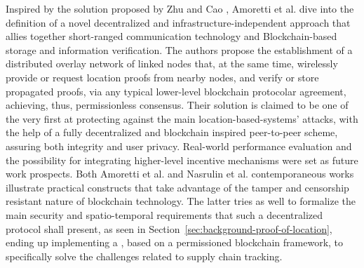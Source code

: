 Inspired by the solution proposed by Zhu and Cao \cite{zhu2011applaus}, Amoretti et al. \cite{amoretti2018blockchain} dive into the definition of a novel decentralized and infrastructure-independent approach that allies together short-ranged communication technology and Blockchain-based storage and information verification. The authors propose the establishment of a distributed overlay network of linked nodes that, at the same time, wirelessly provide or request location proofs from nearby nodes, and verify or store propagated proofs, via any typical lower-level blockchain protocolar agreement, achieving, thus, permissionless consensus. Their solution is claimed to be one of the very first at protecting against the main location-based-systems' attacks, with the help of a fully decentralized and blockchain inspired peer-to-peer scheme, assuring both integrity and user privacy. Real-world performance evaluation and the possibility for integrating higher-level incentive mechanisms were set as future work prospects. Both Amoretti et al. \cite{amoretti2018blockchain} and Nasrulin et al. \cite{nasrulin2018robust} contemporaneous works illustrate practical constructs that take advantage of the tamper and censorship resistant nature of blockchain technology. The latter tries as well to formalize the main security and spatio-temporal requirements that such a decentralized \pol{} protocol shall present, as seen in Section~\ref{sec:background-proof-of-location}, ending up implementing a \poc{}, based on a permissioned blockchain framework, to specifically solve the challenges related to supply chain tracking.

